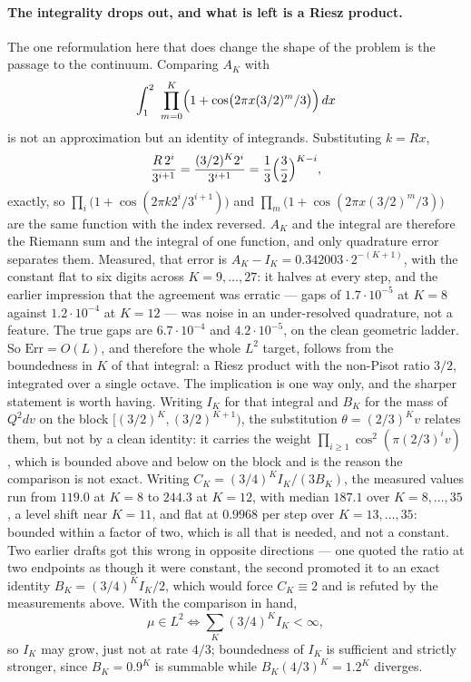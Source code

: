 \documentclass[11pt]{article}
\theoremstyle{remark}
\begin{document}
\paragraph{The integrality drops out, and what is left is a Riesz product.} The one reformulation here
that does change the shape of the problem is the passage to the continuum. Comparing $A_K$ with
\[
  \int_1^2\ \prod_{m=0}^{K}\Bigl(1+\cos\bigl(2\pi x(3/2)^m/3\bigr)\Bigr)\,dx
\]
is not an approximation but an identity of integrands. Substituting $k=Rx$,
\[
  \frac{R\,2^i}{3^{i+1}}=\frac{(3/2)^K2^i}{3^{i+1}}=\frac13\Bigl(\frac32\Bigr)^{K-i},
\]
exactly, so $\prod_i\bigl(1+\cos(2\pi k2^i/3^{i+1})\bigr)$ and $\prod_m\bigl(1+\cos(2\pi x(3/2)^m/3)\bigr)$
are the same function with the index reversed. $A_K$ and the integral are therefore the Riemann sum and
the integral of one function, and only quadrature error separates them. Measured, that error is
$A_K-I_K=0.342003\cdot2^{-(K+1)}$, with the constant flat to six digits across $K=9,\dots,27$: it halves
at every step, and the earlier impression that the agreement was erratic --- gaps of $1.7\cdot10^{-5}$ at
$K=8$ against $1.2\cdot10^{-4}$ at $K=12$ --- was noise in an under-resolved quadrature, not a feature.
The true gaps are $6.7\cdot10^{-4}$ and $4.2\cdot10^{-5}$, on the clean geometric ladder. So
$\mathrm{Err}=O(L)$, and therefore the whole $L^2$ target, follows from the boundedness in $K$ of
that integral: a Riesz product with the non-Pisot ratio $3/2$, integrated over a single octave. The
implication is one way only, and the sharper statement is worth having. Writing $I_K$ for that integral
and $B_K$ for the mass of $Q^2dv$ on the block $[(3/2)^K,(3/2)^{K+1})$, the substitution
$\theta=(2/3)^Kv$ relates them, but not by a clean identity: it carries the weight
$\prod_{i\ge1}\cos^2(\pi(2/3)^iv)$, which is bounded above and below on the block and is the reason the
comparison is not exact. Writing $C_K=(3/4)^KI_K/(3B_K)$, the measured values run from $119.0$ at $K=8$ to
$244.3$ at $K=12$, with median $187.1$ over $K=8,\dots,35$, a level shift near $K=11$, and flat at
$0.9968$ per step over $K=13,\dots,35$: bounded within a factor of two, which is all that is needed, and
not a constant. Two earlier drafts got this wrong in opposite directions --- one quoted the ratio at two
endpoints as though it were constant, the second promoted it to an exact identity $B_K=(3/4)^KI_K/2$,
which would force $C_K\equiv2$ and is refuted by the measurements above. With the comparison in hand,
\[
  \mu\in L^2\iff\sum_K(3/4)^KI_K<\infty ,
\]
so $I_K$ may grow, just not at rate $4/3$; boundedness of $I_K$ is sufficient and strictly stronger, since
$B_K=0.9^K$ is summable while $B_K(4/3)^K=1.2^K$ diverges.
\end{document}
